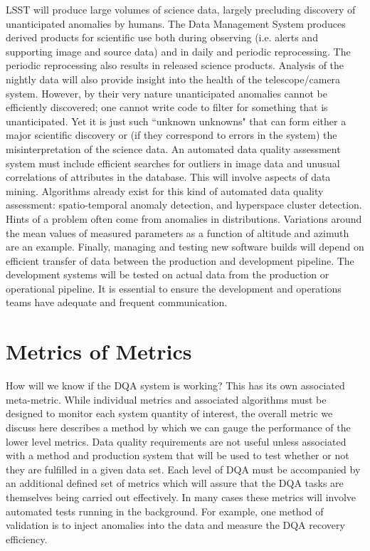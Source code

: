\documentclass[SE,toc,lsstdraft]{lsstdoc}
\newcommand{\newtext}[1]{{\color{blue} #1}}
\begin{document}
LSST will produce large volumes of science data, largely precluding discovery of unanticipated anomalies by humans.  The Data Management System produces derived products for scientific use both during observing (i.e. alerts and supporting image and source data) and in daily and periodic reprocessing.  The periodic reprocessing also results in released science products. Analysis of the nightly data will also provide insight into the health of the telescope/camera system.  However, by their very nature unanticipated anomalies cannot be efficiently discovered; one cannot write code to filter for something that is unanticipated. Yet it is just such ``unknown unknowns" that can form either a major scientific discovery or (if they correspond to errors in the system) the misinterpretation of the science data.  An automated data quality assessment system must include efficient searches for outliers in image data and unusual correlations of attributes in the database. This will involve aspects of data mining.  Algorithms already exist for this kind of automated data quality assessment: spatio-temporal anomaly detection, and hyperspace cluster detection.
Hints of a problem often come from anomalies in distributions.  Variations around the mean values of measured parameters as a function of altitude and azimuth are an example.
Finally, managing and testing new software builds will depend on efficient transfer of data between the production and development pipeline. The development systems will be tested on actual data from the production or operational pipeline. It is essential to ensure the development and operations teams have adequate and frequent communication.

\section{Metrics of Metrics}

How will we know if the DQA system is working? This has its own associated meta-metric. While individual metrics and associated algorithms must be designed to monitor each system quantity of interest, the overall metric we discuss here describes a method by which we can gauge the performance of the lower level metrics.
Data quality requirements are not useful unless associated with a
method and production system that will be used to test whether or not they are fulfilled in
a given data set. Each level of DQA must be accompanied by an additional defined set of metrics which will assure that
the DQA tasks are themselves being carried out effectively. In many cases these metrics will involve
automated tests running in the background.
\newtext{For example, one method of validation is to inject anomalies into the data and measure the DQA recovery efficiency.}
\end{document}

